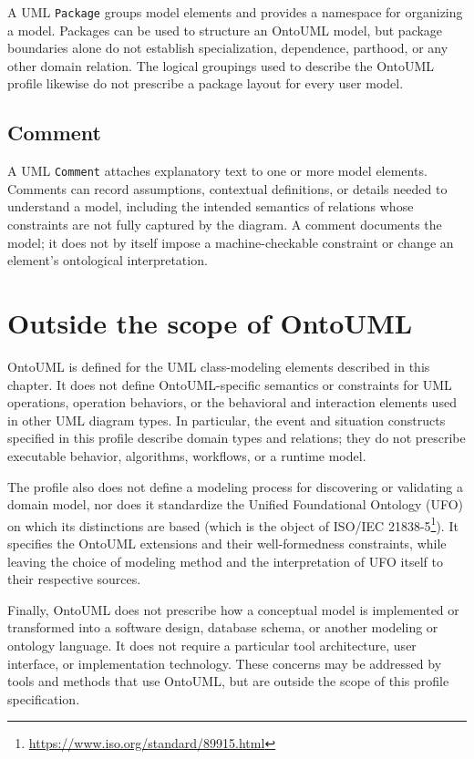 A UML \texttt{Package} groups model elements and provides a namespace for organizing a model. Packages can be used to structure an OntoUML model, but package boundaries alone do not establish specialization, dependence, parthood, or any other domain relation. The logical groupings used to describe the OntoUML profile likewise do not prescribe a package layout for every user model.

\subsection{Comment}

A UML \texttt{Comment} attaches explanatory text to one or more model elements. Comments can record assumptions, contextual definitions, or details needed to understand a model, including the intended semantics of relations whose constraints are not fully captured by the diagram. A comment documents the model; it does not by itself impose a machine-checkable constraint or change an element's ontological interpretation.

\section{Outside the scope of OntoUML}

OntoUML is defined for the UML class-modeling elements described in this chapter. It does not define OntoUML-specific semantics or constraints for UML operations, operation behaviors, or the behavioral and interaction elements used in other UML diagram types. In particular, the event and situation constructs specified in this profile describe domain types and relations; they do not prescribe executable behavior, algorithms, workflows, or a runtime model.

The profile also does not define a modeling process for discovering or validating a domain model, nor does it standardize the Unified Foundational Ontology (UFO) on which its distinctions are based (which is the object of ISO/IEC 21838-5\footnote{\url{ https://www.iso.org/standard/89915.html}}). It specifies the OntoUML extensions and their well-formedness constraints, while leaving the choice of modeling method and the interpretation of UFO itself to their respective sources.

Finally, OntoUML does not prescribe how a conceptual model is implemented or transformed into a software design, database schema, or another modeling or ontology language. It does not require a particular tool architecture, user interface, or implementation technology. These concerns may be addressed by tools and methods that use OntoUML, but are outside the scope of this profile specification.
